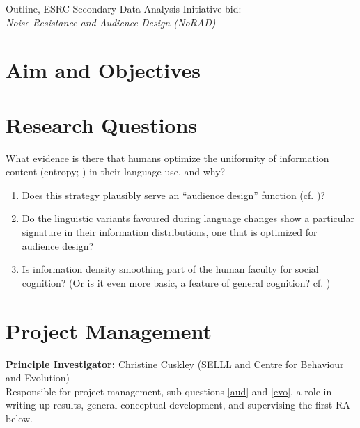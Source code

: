 \documentclass[11pt]{article}
\date{} %
\begin{document}

\begin{center}
\large{Outline, ESRC Secondary Data Analysis Initiative bid:\\ \textsl{Noise Resistance and Audience Design (NoRAD)}}
\end{center}
\vspace{5mm}

\section{Aim and Objectives}

\section{Research Questions}

What evidence is there that humans optimize the uniformity of information content (entropy; \citealt{shannon1948}) in their language use, and why?
\begin{enumerate}
	\item \label{aud} Does this strategy plausibly serve an ``audience design'' function (cf. \citealt{levyjaeger2007})?
	\item \label{change} Do the linguistic variants favoured during language changes show a particular signature in their information distributions, one that is optimized for audience design?
	\item \label{evo} Is information density smoothing part of the human faculty for social cognition? (Or is it even more basic, a feature of general cognition? cf. \citealt{shillcocketal2018})
\end{enumerate}


\section{Project Management}

\noindent\textbf{Principle Investigator:} Christine Cuskley (SELLL and Centre for Behaviour and Evolution)\\
Responsible for project management, sub-questions \ref{aud} and \ref{evo}, a role in writing up results, general conceptual development, and supervising the first RA below.\\
\end{document}
